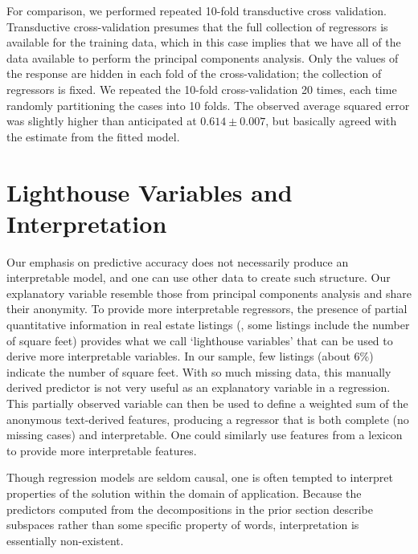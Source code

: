 \documentclass[10pt]{article}
\begin{document}
For comparison, we performed repeated 10-fold transductive cross validation.  Transductive cross-validation presumes that the full collection of regressors is available for the training data, which in this case implies that we have all of the data available to perform the principal components analysis.  Only the values of the response are hidden in each fold of the cross-validation; the collection of regressors is fixed.  We repeated the 10-fold cross-validation 20 times, each time randomly partitioning the cases into 10 folds. The observed average squared error was slightly higher than anticipated at $0.614 \pm 0.007$, but basically agreed with the estimate from the fitted model. 


\section{Lighthouse Variables and Interpretation}
\label{sec:light}
 
 

 Our emphasis on predictive accuracy does not necessarily produce an
 interpretable model, and one can use other data to create such structure.  Our
 explanatory variable resemble those from principal components analysis and
 share their anonymity.  To provide more interpretable regressors, the presence
 of partial quantitative information in real estate listings (\eg, some listings
 include the number of square feet) provides what we call ‘lighthouse variables’
 that can be used to derive more interpretable variables.  In our sample, few
 listings (about 6\%) indicate the number of square feet.  With so much missing
 data, this manually derived predictor is not very useful as an explanatory
 variable in a regression.  This partially observed variable can then be used to
 define a weighted sum of the anonymous text-derived features, producing a
 regressor that is both complete (no missing cases) and interpretable.  One
 could similarly use features from a lexicon to provide more interpretable
 features.


Though regression models are seldom causal, one is often tempted to interpret
 properties of the solution within the domain of application.  Because the
 predictors computed from the decompositions in the prior section describe
 subspaces rather than some specific property of words, interpretation is
 essentially non-existent.
\end{document}
